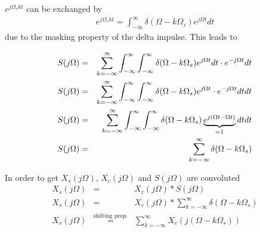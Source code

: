 $e^{j \Omega_s k t}$ can be exchanged by
\begin{eqnarray*}
e^{j \Omega_s k t} =  \int_{-\infty}^{\infty} \delta(\Omega - k\Omega_s) e^{j \Omega t} dt
\end{eqnarray*}
due to the masking property of the delta impulse. This leads to

\begin{eqnarray*}
S(j\Omega) & = & \sum_{k=-\infty}^{\infty}  \int_{-\infty}^{\infty} \int_{-\infty}^{\infty} \delta(\Omega - k\Omega_s) e^{j \Omega t} dt \cdot e^{-j \Omega t} dt \\
S(j\Omega) & = & \sum_{k=-\infty}^{\infty}  \int_{-\infty}^{\infty} \int_{-\infty}^{\infty} \delta(\Omega - k\Omega_s) e^{j \Omega t} \cdot e^{-j \Omega t} dt dt \\
S(j\Omega) & = & \sum_{k=-\infty}^{\infty}  \int_{-\infty}^{\infty} \int_{-\infty}^{\infty} \delta(\Omega - k\Omega_s) \underbrace{e^{j (\Omega t-\Omega t)}}_{=1} dt dt \\
S(j\Omega) & = & \sum_{k=-\infty}^{\infty} \delta(\Omega - k\Omega_s)
\end{eqnarray*}

In order to get $X_s(j\Omega)$, $X_c(j\Omega)$ and $S(j\Omega)$ are convoluted
\begin{eqnarray*}
X_s(j\Omega) & = & X_c(j\Omega) \ast S(j\Omega) \\
X_s(j\Omega) & = & X_c(j\Omega) \ast \sum_{k=-\infty}^{\infty} \delta(\Omega - k\Omega_s) \\
X_s(j\Omega) & \overset{\text{shifting prop.}}{=} & \sum_{k=-\infty}^{\infty} X_c(j(\Omega-k\Omega_s) )
\end{eqnarray*}


